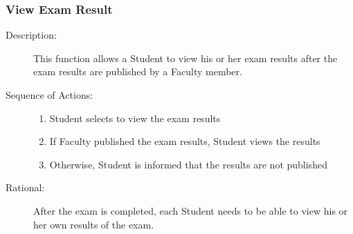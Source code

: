    \subsubsection{\large View Exam Result} 
   \begin{boxed} %
      \begin{description}
         \item[Description:\label{desc:student_view}]
      This function allows a Student to view his or her exam results after
      the exam results are published by a Faculty member.
         
            \item[Sequence of Actions:]\hspace{10cm}
         \begin{enumerate}
            \item Student selects to view the exam results
            \item If Faculty published the exam results, Student views the
               results
            \item Otherwise, Student is informed that the results are not
               published
         \end{enumerate}

            \item[Rational:]
         After the exam is completed, each Student needs to be able to view his
         or her own results of the exam.
      \end{description}
   \end{boxed} %
